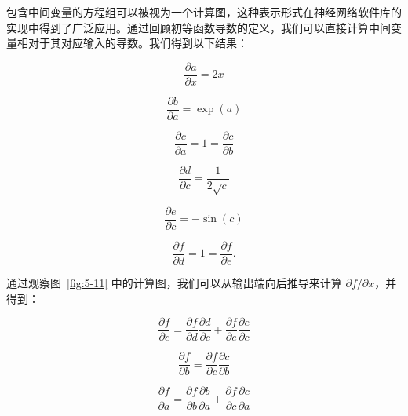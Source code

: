 \begin{notebox}
包含中间变量的方程组可以被视为一个计算图，这种表示形式在神经网络软件库的实现中得到了广泛应用。通过回顾初等函数导数的定义，我们可以直接计算中间变量相对于其对应输入的导数。我们得到以下结果：

\begin{equation}
\frac{\partial a}{\partial x} = 2x
\tag{5.129}\label{eq:5-129}
\end{equation}

\begin{equation}
\frac{\partial b}{\partial a} = \exp(a)
\tag{5.130}\label{eq:5-130}
\end{equation}

\begin{equation}
\frac{\partial c}{\partial a} = 1 = \frac{\partial c}{\partial b}
\tag{5.131}\label{eq:5-131}
\end{equation}

\begin{equation}
\frac{\partial d}{\partial c} = \frac{1}{2\sqrt{c}}
\tag{5.132}\label{eq:5-132}
\end{equation}

\begin{equation}
\frac{\partial e}{\partial c} = -\sin(c)
\tag{5.133}\label{eq:5-133}
\end{equation}

\begin{equation}
\frac{\partial f}{\partial d} = 1 = \frac{\partial f}{\partial e} .
\tag{5.134}\label{eq:5-134}
\end{equation}

通过观察图~\ref{fig:5-11} 中的计算图，我们可以从输出端向后推导来计算 $ \partial f/\partial x $，并得到：

\begin{equation}
\frac{\partial f}{\partial c} = \frac{\partial f}{\partial d} \frac{\partial d}{\partial c} + \frac{\partial f}{\partial e} \frac{\partial e}{\partial c}
\tag{5.135}\label{eq:5-135}
\end{equation}

\begin{equation}
\frac{\partial f}{\partial b} = \frac{\partial f}{\partial c} \frac{\partial c}{\partial b}
\tag{5.136}\label{eq:5-136}
\end{equation}

\begin{equation}
\frac{\partial f}{\partial a} = \frac{\partial f}{\partial b} \frac{\partial b}{\partial a} + \frac{\partial f}{\partial c} \frac{\partial c}{\partial a}
\tag{5.137}\label{eq:5-137}
\end{equation}


\end{notebox}

